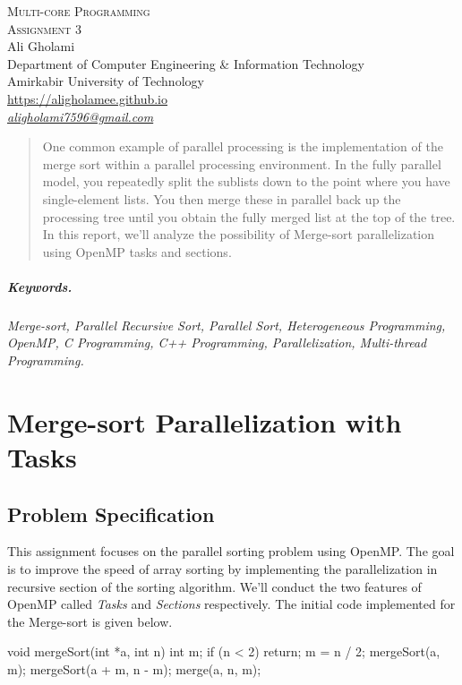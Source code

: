 \documentclass[12pt]{article}
\numberwithin{equation}{section}
\numberwithin{table}{section}
\numberwithin{figure}{section}
\begin{document}

\begin{center}
\textsc{\Huge Multi-core Programming} \\[2pt]
	\textsc{\Large Assignment 3}\\
	\vspace{0.5cm}
  Ali Gholami \\[6pt]
  Department of Computer Engineering \& Information Technology\\
  Amirkabir University of Technology  \\[6pt]
  \def\UrlFont{\em}
  \url{https://aligholamee.github.io}\\
\href{mailto:aligholami7596@gmail.com}{\textit{aligholami7596@gmail.com}}
\end{center}

\begin{abstract}
One common example of parallel processing is the implementation of the merge sort within a parallel processing environment. In the fully parallel model, you repeatedly split the sublists down to the point where you have single-element lists. You then merge these in parallel back up the processing tree until you obtain the fully merged list at the top of the tree. In this report, we'll analyze the possibility of Merge-sort parallelization using OpenMP tasks and sections.
\end{abstract} 

\subparagraph{Keywords.} \textit{Merge-sort, Parallel Recursive Sort, Parallel Sort, Heterogeneous Programming, OpenMP, C Programming, C++ Programming, Parallelization, Multi-thread Programming.}

\section{Merge-sort Parallelization with Tasks}
\subsection{Problem Specification}
This assignment focuses on the parallel sorting problem using OpenMP. The goal is to improve the speed of array sorting by implementing the parallelization in recursive section of the sorting algorithm. We'll conduct the two features of OpenMP called \textit{Tasks} and \textit{Sections} respectively. The initial code implemented for the Merge-sort is given below.
\begin{cpp}
		void mergeSort(int *a, int n) {
			int m;
			if (n < 2)
			return;
			m = n / 2;
			mergeSort(a, m);
			mergeSort(a + m, n - m);
			merge(a, n, m);
		}
\end{cpp}
\end{document}
